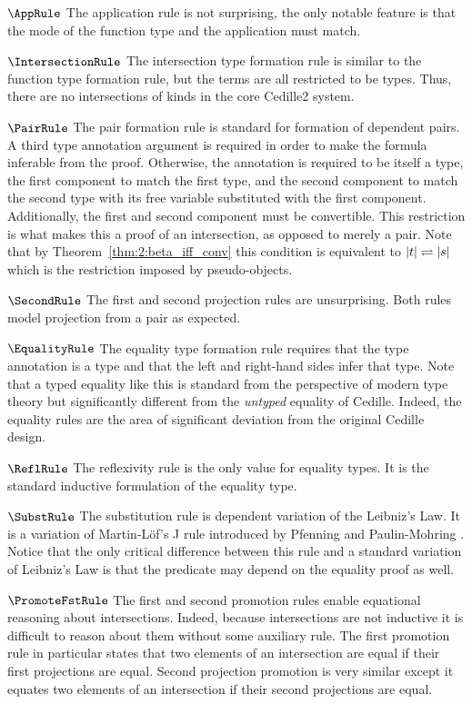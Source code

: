 $\AppRule$ The application rule is not surprising, the only notable feature is that the mode of the function type and the application must match.

$\IntersectionRule$ The intersection type formation rule is similar to the function type formation rule, but the terms are all restricted to be types.
Thus, there are no intersections of kinds in the core Cedille2 system.

$\PairRule$ The pair formation rule is standard for formation of dependent pairs.
A third type annotation argument is required in order to make the formula inferable from the proof.
Otherwise, the annotation is required to be itself a type, the first component to match the first type, and the second component to match the second type with its free variable substituted with the first component.
Additionally, the first and second component must be convertible.
This restriction is what makes this a proof of an intersection, as opposed to merely a pair.
Note that by Theorem~\ref{thm:2:beta_iff_conv} this condition is equivalent to $|t| \rightleftharpoons |s|$ which is the restriction imposed by pseudo-objects.

$\SecondRule$ The first and second projection rules are unsurprising.
Both rules model projection from a pair as expected.

$\EqualityRule$ The equality type formation rule requires that the type annotation is a type and that the left and right-hand sides infer that type.
Note that a typed equality like this is standard from the perspective of modern type theory but significantly different from the \textit{untyped} equality of Cedille.
Indeed, the equality rules are the area of significant deviation from the original Cedille design.



$\ReflRule$ The reflexivity rule is the only value for equality types.
It is the standard inductive formulation of the equality type.

$\SubstRule$ The substitution rule is dependent variation of the Leibniz's Law.
It is a variation of Martin-L\"{o}f's J rule introduced by Pfenning and Paulin-Mohring \cite{pfenning1990_subst}.
Notice that the only critical difference between this rule and a standard variation of Leibniz's Law is that the predicate may depend on the equality proof as well.

$\PromoteFstRule$ The first and second promotion rules enable equational reasoning about intersections.
Indeed, because intersections are not inductive it is difficult to reason about them without some auxiliary rule.
The first promotion rule in particular states that two elements of an intersection are equal if their first projections are equal.
Second projection promotion is very similar except it equates two elements of an intersection if their second projections are equal.

